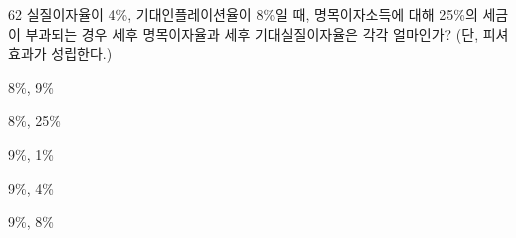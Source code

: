 \begin{question}{62}
실질이자율이 4\%, 기대인플레이션율이 8\%일 때, 명목이자소득에 대해 25\%의 세금이 부과되는 경우 세후 명목이자율과 세후 기대실질이자율은 각각 얼마인가? (단, 피셔효과가 성립한다.)
\begin{choices}
  \item 8\%, 9\%
  \item 8\%, 25\%
  \item 9\%, 1\%
  \item 9\%, 4\%
  \item 9\%, 8\%
\end{choices}
\end{question}
